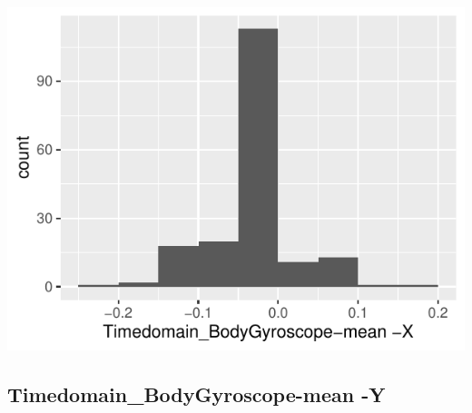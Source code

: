 \documentclass[
]{article}
\begin{document}
\begin{minipage}{0.25 \textwidth}

\includegraphics{codebook_tidydatasub_files/figure-latex/Var-21-Timedomain-BodyGyroscope-mean--X-1.pdf}

\end{minipage}

\noindent\makebox[\linewidth]{\rule{\textwidth}{0.4pt}}

\hypertarget{timedomain_bodygyroscope-mean--y}{%
\subsection{Timedomain\_BodyGyroscope-mean
-Y}\label{timedomain_bodygyroscope-mean--y}}
\end{document}
